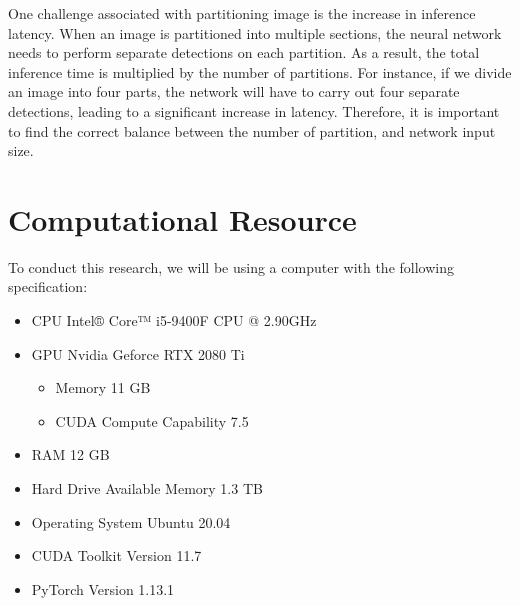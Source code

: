   One challenge associated with partitioning image is the increase in inference latency.
  When an image is partitioned into multiple sections, the neural network needs to perform separate detections on each partition.
  As a result, the total inference time is multiplied by the number of partitions.
  For instance, if we divide an image into four parts, the network will have to carry out four separate detections, leading to a significant increase in latency. 
  Therefore, it is important to find the correct balance between the number of partition, and network input size.
    
\section{Computational Resource}
\label{section:instrument}
To conduct this research, we will be using a computer with the following specification:
\begin{itemize}[noitemsep,leftmargin=.1\textwidth,rightmargin=.1\textwidth]
  \item CPU \hfill Intel® Core™ i5-9400F CPU @ 2.90GHz
  \item GPU \hfill Nvidia Geforce RTX 2080 Ti
  \begin{itemize}[noitemsep,topsep=0pt]
    \item[] Memory \hfill 11 GB
    \item[] CUDA Compute Capability \hfill 7.5
  \end{itemize}
  \item RAM \hfill 12 GB
  \item Hard Drive Available Memory \hfill 1.3 TB
  \item Operating System \hfill Ubuntu 20.04
  \item CUDA Toolkit Version \hfill 11.7
  \item PyTorch Version \hfill 1.13.1
\end{itemize}

